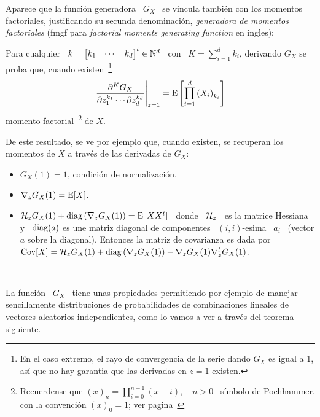 Aparece  que la  funci\'on generadora  \ $G_X$  \ se  vincula tambi\'en  con los
momentos factoriales, justificando su secunda denominaci\'on, {\em generadora de
  momentos factoriales}  (fmgf para {\em factorial  moments generating function}
en ingles):
%
\begin{lema}
\label{Lem:MP:GeneracionMomentosFactoriales}
%
  Para cualquier \  $k = \begin{bmatrix} k_1 & \cdots  & k_d \end{bmatrix}^t \in
  \mathbb{N}^d$ \ con \ $K =  \sum_{i=1}^d k_i$, derivando $G_X$ se proba que, cuando
  existen~\footnote{En el  caso extremo,  el rayo de  convergencia de  la serie
    dando $G_X$ es igual a 1, as\'i  que no hay garantia que las derivadas en $z
    = 1$ existen.}
  \[
  \left.\frac{\partial^K     G_X}{\partial     z_1^{k_1}     \cdots     \partial
      z_d^{k_d}}\right|_{z=1}    =   \operatorname{E}\left[    \prod_{i=1}^d    \left(   X_i
    \right)_{k_i} \right]
  \]
  momento factorial~\footnote{Recuerdense que  $(x)_n = \prod_{i=0}^{n-1} (x-i),
    \quad n > 0$ \ s\'imbolo de Pochhammer, con la convenci\'on $(x)_0 = 1$; ver
    pagina~\pageref{Foot:MP:Pochhammer}} de $X$.
\end{lema}

De  este resultado,  se ve  por ejemplo  que, cuando  existen, se  recuperan los
momentos de $X$ a trav\'es de las derivadas de $G_X$:
%
\begin{itemize}
\item $G_X(1) = 1$, condici\'on de normalizaci\'on.
%
\item $\nabla_z G_X(1) = \operatorname{E}[X]$.
%
\item $\mathcal{H}_z G_X(1)  + \operatorname{diag}\left( \nabla_z G_X(1) \right)  = \operatorname{E}\left[ X X^t
  \right]$  \ donde  \ $\mathcal{H}_z$  \ es  la matrice  Hessiana
y \
  $\operatorname{diag}(a)$ es  une matriz  diagonal de componentes  \ $(i,i)$-esima \  $a_i$ \
  (vector $a$ sobre la diagonal).  Entonces  la matriz de covarianza es dada por
  \ $\operatorname{Cov}[X] =  \mathcal{H}_z G_X(1) + \operatorname{diag}\left( \nabla_z  G_X(1) \right) - \nabla_z
  G_X(1) \nabla_z^t G_X(1)$.
\end{itemize}

\

La funci\'on \ $G_X$ \ tiene unas propiedades permitiendo por ejemplo de manejar
sencillamente  distribuciones  de probabilidades  de  combinaciones lineales  de
vectores aleatorios independientes,  como lo vamos a ver  a trav\'es del teorema
siguiente.

